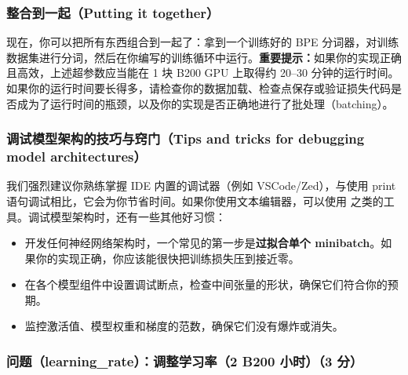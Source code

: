 \subsubsection{整合到一起（Putting it together）}

现在，你可以把所有东西组合到一起了：拿到一个训练好的 BPE 分词器，对训练数据集进行分词，然后在你编写的训练循环中运行。\textbf{重要提示：}如果你的实现正确且高效，上述超参数应当能在 1 块 B200 GPU 上取得约 20--30 分钟的运行时间。如果你的运行时间要长得多，请检查你的数据加载、检查点保存或验证损失代码是否成为了运行时间的瓶颈，以及你的实现是否正确地进行了批处理（batching）。

\subsubsection{调试模型架构的技巧与窍门（Tips and tricks for debugging model architectures）}

我们强烈建议你熟练掌握 IDE 内置的调试器（例如 VSCode/Zed），与使用 print 语句调试相比，它会为你节省时间。如果你使用文本编辑器，可以使用  之类的工具。调试模型架构时，还有一些其他好习惯：
\begin{itemize}
  \item 开发任何神经网络架构时，一个常见的第一步是\textbf{过拟合单个 minibatch}。如果你的实现正确，你应该能很快把训练损失压到接近零。
  \item 在各个模型组件中设置调试断点，检查中间张量的形状，确保它们符合你的预期。
  \item 监控激活值、模型权重和梯度的范数，确保它们没有爆炸或消失。
\end{itemize}

\subsubsection*{问题（learning\_rate）：调整学习率（2 B200 小时）（3 分）}

